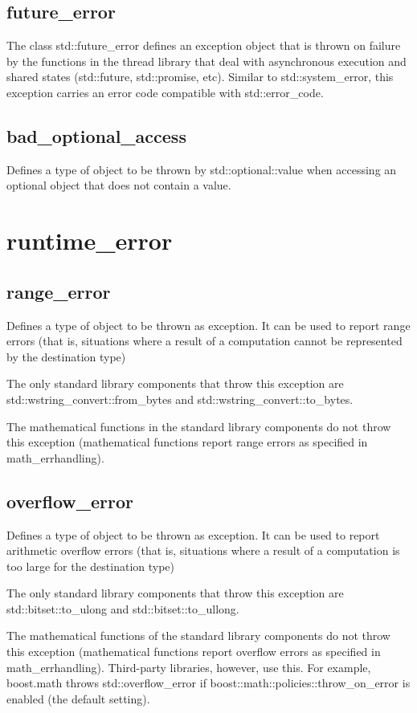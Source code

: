 \documentclass[UTF8,a4paper,12pt]{ctexbook}
\begin{document}
		\subsection{future\_error}
			The class std::future\_error defines an exception object that is thrown on failure by the functions in the thread library that deal with asynchronous execution and shared states (std::future, std::promise, etc). Similar to std::system\_error, this exception carries an error code compatible with std::error\_code. 
		\subsection{bad\_optional\_access}
			Defines a type of object to be thrown by std::optional::value when accessing an optional object that does not contain a value. 
		
	\section{runtime\_error}
		\subsection{range\_error}
			Defines a type of object to be thrown as exception. It can be used to report range errors (that is, situations where a result of a computation cannot be represented by the destination type)
			
			The only standard library components that throw this exception are std::wstring\_convert::from\_bytes and std::wstring\_convert::to\_bytes.
			
			The mathematical functions in the standard library components do not throw this exception (mathematical functions report range errors as specified in math\_errhandling). 
		\subsection{overflow\_error}
			Defines a type of object to be thrown as exception. It can be used to report arithmetic overflow errors (that is, situations where a result of a computation is too large for the destination type)
			
			The only standard library components that throw this exception are std::bitset::to\_ulong and std::bitset::to\_ullong.
			
			The mathematical functions of the standard library components do not throw this exception (mathematical functions report overflow errors as specified in math\_errhandling). Third-party libraries, however, use this. For example, boost.math throws std::overflow\_error if boost::math::policies::throw\_on\_error is enabled (the default setting). 
\end{document}
